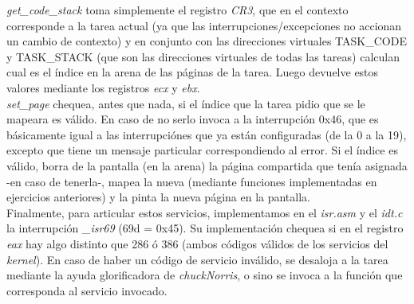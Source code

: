 \textit{get\_code\_stack} toma simplemente el registro \textit{CR3}, que en el contexto corresponde a la tarea actual (ya que las interrupciones/excepciones no accionan un cambio de contexto) y en conjunto con las direcciones virtuales TASK\_CODE y TASK\_STACK (que son las direcciones virtuales de todas las tareas) calculan cual es el índice en la arena de las páginas de la tarea. Luego devuelve estos valores mediante los registros \textit{ecx} y \textit{ebx}.\\

\textit{set\_page} chequea, antes que nada, si el índice que la tarea pidio que se le mapeara es válido. En caso de no serlo invoca a la interrupción 0x46, que es básicamente igual a las interrupciónes que ya están configuradas (de la 0 a la 19), excepto que tiene un mensaje particular correspondiendo al error. Si el índice es válido, borra de la pantalla (en la arena) la página compartida que tenía asignada -en caso de tenerla-, mapea la nueva (mediante funciones implementadas en ejercicios anteriores) y la pinta la nueva página en la pantalla.\\

Finalmente, para articular estos servicios, implementamos en el \textit{isr.asm} y el \textit{idt.c} la interrupción \textit{\_isr69} (69d = 0x45). Su implementación chequea si en el registro \textit{eax} hay algo distinto que 286 ó 386 (ambos códigos válidos de los servicios del \textit{kernel}). En caso de haber un código de servicio inválido, se desaloja a la tarea mediante la ayuda glorificadora de \textit{chuckNorris}, o sino se invoca a la función que corresponda al servicio invocado.